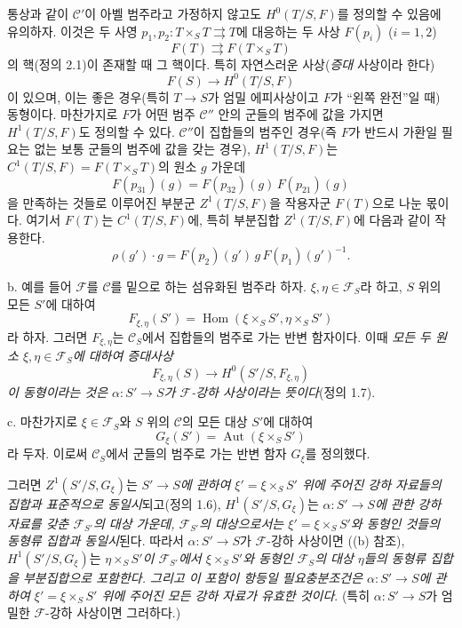 \documentclass[11pt,twoside,openany]{book}
\numberwithin{equation}{section}
\newcommand{\sourceunit}{front}
\newcommand{\src}[1]{%
  \phantomsection\hypertarget{src:\sourceunit:#1}{}%
  \marginpar{\raggedleft\footnotesize\sffamily #1}%
}
\theoremstyle{plain}
\theoremstyle{definition}
\theoremstyle{remark}
\begin{document}
통상과 같이 $\mathcal C'$이 아벨 범주라고 가정하지 않고도
$H^0(T/S,F)$를 정의할 수 있음에 유의하자. 이것은 두 사영
$p_1,p_2:T\times_ST\rightrightarrows T$에 대응하는 두 사상
$F(p_i)$ ($i=1,2$)
\[
  F(T)\rightrightarrows F(T\times_ST)
\]
의 핵(정의 2.1)이 존재할 때 그 핵이다. 특히 자연스러운 사상(\emph{증대}
사상이라 한다)
\[
  F(S)\longrightarrow H^0(T/S,F)
\]
이 있으며, 이는 좋은 경우(특히 $T\longrightarrow S$가 엄밀
에피사상이고 $F$가 ``왼쪽 완전''일 때) 동형이다. 마찬가지로 $F$가 어떤
범주 $\mathcal C''$ 안의 군들의 범주에 값을 가지면 $H^1(T/S,F)$도 정의할
수 있다. $\mathcal C''$이 집합들의 범주인 경우(즉 $F$가 반드시 가환일
필요는 없는 보통 군들의 범주에 값을 갖는 경우), $H^1(T/S,F)$는
$C^1(T/S,F)=F(T\times_ST)$의 원소 $g$ 가운데
\[
  F(p_{31})(g)=F(p_{32})(g)\,F(p_{21})(g)
\]
을 만족하는 것들로 이루어진 부분군 $Z^1(T/S,F)$을 작용자군 $F(T)$으로
나눈 몫이다. 여기서 $F(T)$는 $C^1(T/S,F)$에, 특히 부분집합
$Z^1(T/S,F)$에 다음과 같이 작용한다.
\[
  \rho(g')\cdot g=F(p_2)(g')\,g\,F(p_1)(g')^{-1}.
\]

\medskip\noindent
b. 예를 들어 $\mathcal F$를 $\mathcal C$를 밑으로 하는 섬유화된 범주라
하자. $\xi,\eta\in\mathcal F_S$라 하고, $S$ 위의 모든 $S'$에 대하여
\[
  F_{\xi,\eta}(S')=
  \operatorname{Hom}(\xi\times_SS',\eta\times_SS')
\]
라 하자. 그러면 $F_{\xi,\eta}$는 $\mathcal C_S$에서 집합들의 범주로
가는 반변 함자이다. 이때 \emph{모든 두 원소
$\xi,\eta\in\mathcal F_S$에 대하여 증대사상}
\[
  F_{\xi,\eta}(S)\longrightarrow H^0(S'/S,F_{\xi,\eta})
\]
\emph{이 동형이라는 것은 $\alpha:S'\longrightarrow S$가
$\mathcal F$-강하 사상이라는 뜻이다}(정의 1.7).

\medskip\noindent
c. 마찬가지로 $\xi\in\mathcal F_S$와 $S$ 위의 $\mathcal C$의 모든 대상
$S'$에 대하여
\[
  G_\xi(S')=\operatorname{Aut}(\xi\times_SS')
\]
라 두자. 이로써 $\mathcal C_S$에서 군들의 범주로 가는 반변 함자
$G_\xi$를 정의했다.

\src{312}
그러면 $Z^1(S'/S,G_\xi)$는 \emph{$S'\longrightarrow S$에 관하여
$\xi'=\xi\times_SS'$ 위에 주어진 강하 자료들의 집합과 표준적으로
동일시}되고(정의 1.6), $H^1(S'/S,G_\xi)$는 \emph{$\alpha:S'\longrightarrow S$에
관한 강하 자료를 갖춘 $\mathcal F_{S'}$의 대상 가운데,
$\mathcal F_{S'}$의 대상으로서는 $\xi'=\xi\times_SS'$와 동형인 것들의
동형류 집합과 동일시}된다. 따라서 $\alpha:S'\longrightarrow S$가
$\mathcal F$-강하 사상이면 ((b) 참조), $H^1(S'/S,G_\xi)$는
\emph{$\eta\times_SS'$이 $\mathcal F_{S'}$에서 $\xi\times_SS'$와 동형인
$\mathcal F_S$의 대상 $\eta$들의 동형류 집합을 부분집합으로 포함한다.
그리고 이 포함이 항등일 필요충분조건은 $\alpha:S'\longrightarrow S$에
관하여 $\xi'=\xi\times_SS'$ 위에 주어진 모든 강하 자료가 유효한 것이다}.
(특히 $\alpha:S'\longrightarrow S$가 엄밀한 $\mathcal F$-강하 사상이면
그러하다.)
\end{document}

